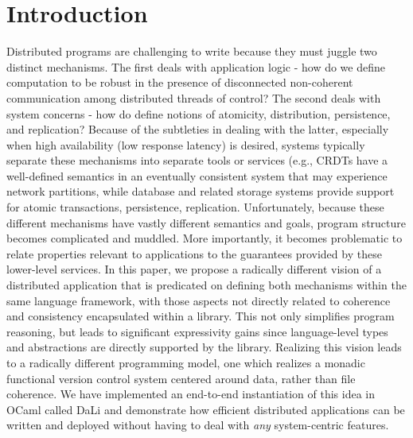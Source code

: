 \section{Introduction}

Distributed programs are challenging to write because they must juggle
two distinct mechanisms.  The first deals with application logic - how
do we define computation to be robust in the presence of disconnected
non-coherent communication among distributed threads of control?  The
second deals with system concerns - how do define notions of
atomicity, distribution, persistence, and replication?  Because of the
subtleties in dealing with the latter, especially when high
availability (low response latency) is desired, systems typically
separate these mechanisms into separate tools or services (e.g., CRDTs
have a well-defined semantics in an eventually consistent system that
may experience network partitions, while database and related storage
systems provide support for atomic transactions, persistence,
replication.  Unfortunately, because these different mechanisms have
vastly different semantics and goals, program structure becomes
complicated and muddled.  More importantly, it becomes problematic to
relate properties relevant to applications to the guarantees provided
by these lower-level services.  In this paper, we propose a radically
different vision of a distributed application that is predicated on
defining both mechanisms within the same language framework, with
those aspects not directly related to coherence and consistency
encapsulated within a library.  This not only simplifies program
reasoning, but leads to significant expressivity gains since
language-level types and abstractions are directly supported by the
library.   Realizing this vision leads to a radically different
programming model, one which realizes a monadic functional version
control system centered around data, rather than file coherence.  We
have implemented an end-to-end instantiation of this idea in OCaml
called DaLi and demonstrate how efficient distributed applications can
be written and deployed without having to deal with \emph{any}
system-centric features.
